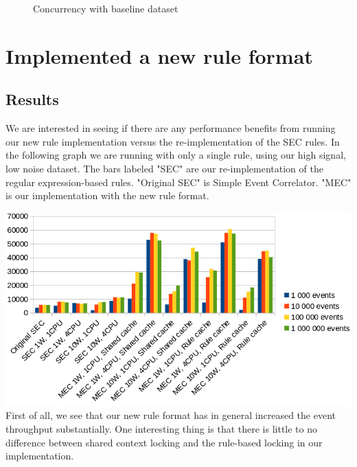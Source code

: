 \begin{figure}[ht]
\centering
\pgfplotsset{scaled y ticks=false}
\caption{Concurrency with baseline dataset}
\label{fig:multicore-b-perf}
\end{figure}

\section{Implemented a new rule format}


\subsection{Results}
We are interested in seeing if there are any performance benefits from running our new rule implementation versus the re-implementation of the SEC rules. In the following graph we are running with only a single rule, using our high signal, low noise dataset. The bars labeled "SEC" are our re-implementation of the regular expression-based rules. "Original SEC" is Simple Event Correlator. "MEC" is our implementation with the new rule format.

\includegraphics[scale=0.525]{figures/new-rule-format/performance.png}
\\
First of all, we see that our new rule format has in general increased the event throughput substantially. One interesting thing is that there is little to no difference between shared context locking and the rule-based locking in our implementation.

